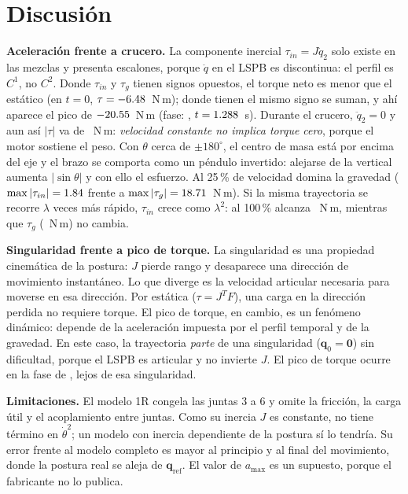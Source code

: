 \documentclass[conference]{IEEEtran}
\begin{document}
\section{Discusión}
\textbf{Aceleración frente a crucero.} La componente inercial $\tau_{in} = J\ddot q_2$ solo existe en las mezclas y
presenta escalones, porque $\ddot q$ en el LSPB es discontinua: el perfil es $C^1$, no $C^2$. Donde $\tau_{in}$ y
$\tau_g$ tienen signos opuestos, el torque neto es menor que el estático (en $t = 0$, $\tau = -6.48$~N\,m); donde
tienen el mismo signo se suman, y ahí aparece el pico de $-20.55$~N\,m (fase: \TauPeakFase, $t = 1.288$~s).
Durante el crucero, $\ddot q_2 = 0$ y aun así $|\tau|$ va de \CruceroRango~N\,m: \emph{velocidad constante no implica
torque cero}, porque el motor sostiene el peso. Con $\theta$ cerca de $\pm180^\circ$, el centro de masa está por encima
del eje y el brazo se comporta como un péndulo invertido: alejarse de la vertical aumenta $|\sin\theta|$ y con ello el
esfuerzo. Al 25\,\% de velocidad domina la gravedad ($\max|\tau_{in}| = 1.84$ frente a
$\max|\tau_g| = 18.71$~N\,m). Si la misma trayectoria se recorre $\lambda$ veces más rápido, $\tau_{in}$ crece como
$\lambda^2$: al 100\,\% alcanza \TauInFull~N\,m, mientras que $\tau_g$ (\TauGFull~N\,m) no cambia.

\textbf{Singularidad frente a pico de torque.} La singularidad es una propiedad cinemática de la postura: $J$ pierde
rango y desaparece una dirección de movimiento instantáneo. Lo que diverge es la velocidad articular necesaria para
moverse en esa dirección. Por estática ($\tau = J^TF$), una carga en la dirección perdida no requiere torque. El pico de
torque, en cambio, es un fenómeno dinámico: depende de la aceleración impuesta por el perfil temporal y de la
gravedad. En este caso, la trayectoria \emph{parte} de una singularidad ($\mathbf{q}_0 = \mathbf{0}$) sin dificultad,
porque el LSPB es articular y no invierte $J$. El pico de torque ocurre en la fase de \TauPeakFase, lejos de esa
singularidad. %

\textbf{Limitaciones.} El modelo 1R congela las juntas 3 a 6 y omite la fricción, la carga útil y el acoplamiento entre
juntas. Como su inercia $J$ es constante, no tiene término en $\dot\theta^2$; un modelo con inercia dependiente de la
postura sí lo tendría. Su error frente al modelo completo es mayor al principio y al final del movimiento, donde la postura real se
aleja de $\mathbf{q}_{\text{ref}}$. El valor de $a_{\max}$ es un supuesto, porque el fabricante no lo publica.
\end{document}
